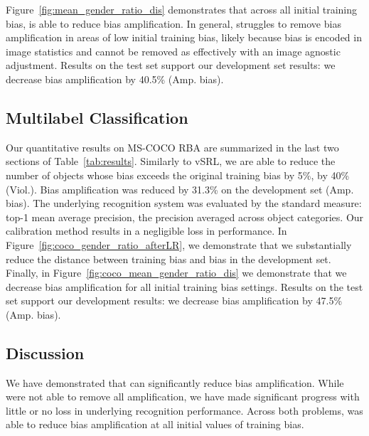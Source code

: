 Figure~\ref{fig:mean_gender_ratio_dis} demonstrates that across all initial training bias, \alg{} is able to reduce bias amplification. 
In general, \alg{} struggles to remove bias amplification in areas of low initial training bias, likely because bias is encoded in image statistics and cannot be removed as effectively with an image agnostic adjustment.
Results on the test set support our development set results: we decrease bias amplification by 40.5\% (Amp. bias).
\subsection{Multilabel Classification}
Our quantitative results on MS-COCO RBA are summarized in the last two sections of Table~\ref{tab:results}. 
Similarly to vSRL, we are able to reduce the number of objects whose bias exceeds the original training bias by 5\%, by 40\% (Viol.).
Bias amplification was reduced by 31.3\% on the development set (Amp. bias). 
The underlying recognition system was evaluated by the standard measure: top-1 mean average precision, the precision averaged across object categories.
Our calibration method results in a negligible loss in performance.
In Figure~\ref{fig:coco_gender_ratio_afterLR}, we demonstrate that we substantially reduce the distance between training bias and bias in the development set.
Finally, in Figure~\ref{fig:coco_mean_gender_ratio_dis} we demonstrate that we decrease bias amplification for all initial training bias settings. 
Results on the test set support our development results: we decrease bias amplification by 47.5\% (Amp. bias).
\subsection{Discussion}
We have demonstrated that \alg{} can significantly reduce bias amplification.
While were not able to remove all amplification, we have made significant progress with little or no loss in underlying recognition performance. 
Across both problems, \alg{} was able to reduce bias amplification at all initial values of training bias. 




